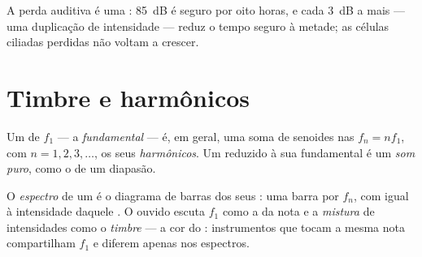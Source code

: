 \begin{remark}\label{rem:g12:sound-acoustics:damage}
A perda auditiva é uma : \qty{85}{dB} é seguro por oito horas, e cada
\qty{3}{dB} a mais --- uma duplicação de intensidade --- reduz o tempo
seguro à metade; as células ciliadas perdidas não voltam a crescer.
\end{remark}

\section{Timbre e harmônicos}

\begin{definition}[Harmônicos]\label{def:g12:sound-acoustics:harmonics}
Um   de  $f_1$ --- a
\emph{fundamental} --- é, em geral, uma soma de
senoides nas  $f_n = n f_1$, com $n = 1, 2, 3, \dots$, os seus
\emph{harmônicos}. Um  reduzido à sua fundamental é
um \emph{som puro}, como o de um diapasão.
\end{definition}

\begin{definition}\label{def:g12:sound-acoustics:timbre}
O \emph{espectro} de um  é o diagrama de barras dos
seus : uma barra por $f_n$, com  igual à intensidade
daquele . O ouvido escuta $f_1$ como a  da nota e a
\emph{mistura} de intensidades como o \emph{timbre} --- a
cor do : instrumentos que tocam a mesma nota compartilham $f_1$ e
diferem apenas nos espectros.
\end{definition}

